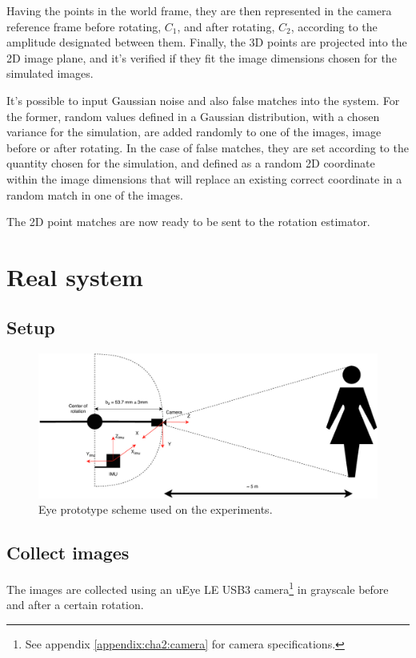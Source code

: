 Having the points in the world frame, they are then represented in the camera reference frame before rotating, ${C_1}$, and after rotating, ${C_2}$, according to the amplitude designated between them. Finally, the 3D points are projected into the 2D image plane, and it's verified if they fit the image dimensions chosen for the simulated images.

It's possible to input Gaussian noise and also false matches into the system. For the former, random values defined in a Gaussian distribution, with a chosen variance for the simulation, are added randomly to one of the images, image before or after rotating. In the case of false matches, they are set according to the quantity chosen for the simulation, and defined as a random 2D coordinate within the image dimensions that will replace an existing correct coordinate in a random match in one of the images.

The 2D point matches are now ready to be sent to the rotation estimator.

\section{Real system}

\subsection{Setup}
\begin{figure}[ht]
	\centering
	\includegraphics[width=\textwidth]{images/eyescheme.pdf}
	\caption[Eye prototype scheme used on the experiments]{Eye prototype scheme used on the experiments.}
	\label{cha4:sec3:eyescheme}
\end{figure}

\subsection{Collect images}
The images are collected using an uEye LE USB3 camera\footnote{See appendix \ref{appendix:cha2:camera} for camera specifications.} in grayscale before and after a certain rotation.

